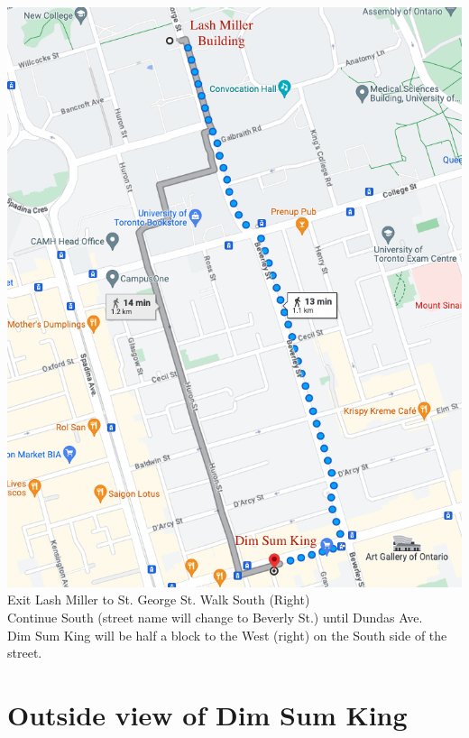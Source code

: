 \documentclass[titlepage,oneside,openany,10pt]{book}
\begin{document}
\begin{center}
	\includegraphics[scale = 0.5]{Other_Figures/map to dim sum king_revised.png}
\\\vspace{0.5cm}
Exit Lash Miller to St. George St. Walk South (Right)\\
Continue South (street name will change to Beverly St.) until Dundas Ave. \\
Dim Sum King will be half a block to the West (right) on the South side of the street.
\end{center}

\section*{Outside view of Dim Sum King}
\label{Outside View_Of_Dimsumking}
\end{document}
